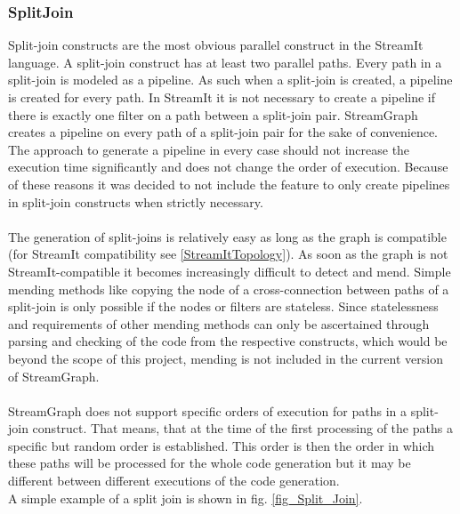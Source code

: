 \documentclass[journal]{IEEEtran}
\begin{document}
\subsubsection{SplitJoin}
\noindent Split-join constructs are the most obvious parallel construct in the
StreamIt language. A split-join construct has at least two parallel paths. Every
path in a split-join is modeled as a pipeline. As such when a split-join is
created, a pipeline is created for every path. In StreamIt it is
not necessary to create a pipeline if there is exactly one filter on a path
between a split-join pair. StreamGraph creates a pipeline on every path of a
split-join pair for the sake of convenience. The approach to generate a
pipeline in every case should not increase the execution time significantly and
does not change the order of execution. Because of these reasons it was decided
to not include the feature to only create pipelines in split-join constructs
when strictly necessary.\\
\\
The generation of split-joins is relatively easy as long as the graph is compatible
(for StreamIt compatibility see \ref{StreamItTopology}). As soon as the graph is not 
StreamIt-compatible it becomes increasingly difficult to detect and mend. Simple 
mending methods like copying the node of a cross-connection between paths of a 
split-join is only possible if the nodes or filters are stateless. Since 
statelessness and requirements of other mending methods can only be ascertained 
through parsing and checking of the code from the respective constructs, which would be beyond 
the scope of this project, mending is not included in the current version of StreamGraph.\\
\\
StreamGraph does not support specific orders of execution for paths in a split-join 
construct. That means, that at the time of the first processing of the paths a specific
but random order is established. This order is then the order in which these paths will 
be processed for the whole code generation but it may be different between different
executions of the code generation.\\
A simple example of a split join is shown in fig. \ref{fig_Split_Join}.\\
\end{document}
